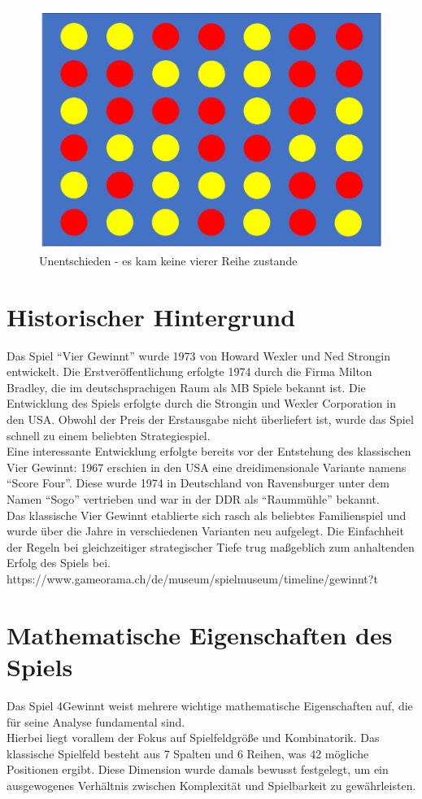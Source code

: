 \begin{figure}[H]
	\centering
	\includegraphics[width=0.8\linewidth]{images/Unentschieden}
	\caption[Unentschieden]{Unentschieden - es kam keine vierer Reihe zustande}
	\label{fig:unentschiedent}
\end{figure}
\newpage
\section{Historischer Hintergrund}
Das Spiel “Vier Gewinnt” wurde 1973 von Howard Wexler und Ned Strongin entwickelt. Die Erstveröffentlichung erfolgte 1974 durch die Firma Milton Bradley, die im deutschsprachigen Raum als MB Spiele bekannt ist.
Die Entwicklung des Spiels erfolgte durch die Strongin und Wexler Corporation in den USA. Obwohl der Preis der Erstausgabe nicht überliefert ist, wurde das Spiel schnell zu einem beliebten Strategiespiel.\\
Eine interessante Entwicklung erfolgte bereits vor der Entstehung des klassischen Vier Gewinnt: 1967 erschien in den USA eine dreidimensionale Variante namens “Score Four”. Diese wurde 1974 in Deutschland von Ravensburger unter dem Namen “Sogo” vertrieben und war in der DDR als “Raummühle” bekannt.\\
Das klassische Vier Gewinnt etablierte sich rasch als beliebtes Familienspiel und wurde über die Jahre in verschiedenen Varianten neu aufgelegt. Die Einfachheit der Regeln bei gleichzeitiger strategischer Tiefe trug maßgeblich zum anhaltenden Erfolg des Spiels bei.\\
https://www.gameorama.ch/de/museum/spielmuseum/timeline/gewinnt?t
\section{Mathematische Eigenschaften des Spiels}
Das Spiel 4Gewinnt weist mehrere wichtige mathematische Eigenschaften auf, die für seine Analyse fundamental sind.\\
Hierbei liegt vorallem der Fokus auf Spielfeldgröße und Kombinatorik. Das klassische Spielfeld besteht aus 7 Spalten und 6 Reihen, was 42 mögliche Positionen ergibt. Diese Dimension wurde damals bewusst festgelegt, um ein ausgewogenes Verhältnis zwischen Komplexität und Spielbarkeit zu gewährleisten.\\

